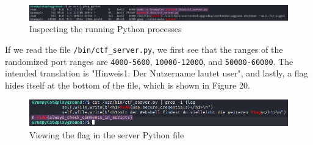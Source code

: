 \documentclass[a4paper]{article}
\newcommand{\abc}{\hfill \break}
\begin{document}
\begin{figure}[ht]
	\includegraphics[scale=0.25]{images/psauxpy.png}
	\centering
	\caption{Inspecting the running Python processes}
\end{figure}\abc
If we read the file \texttt{/bin/ctf\_server.py}, we first see that the ranges of the randomized port ranges are \texttt{4000-5600}, \texttt{10000-12000}, and \texttt{50000-60000}. The intended translation is "Hinweis1: Der Nutzername lautet user", and lastly, a flag hides itself at the bottom of the file, which is shown in Figure 20.
\begin{figure}[h]
	\includegraphics[scale=0.35]{images/commentflag.png}
	\centering
	\caption{Viewing the flag in the server Python file}
\end{figure}\abc
\newpage
\end{document}

